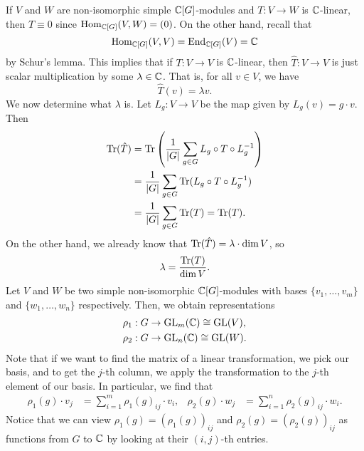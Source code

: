 If $V$ and $W$ are non-isomorphic simple $\mathbb{C}[G]$-modules and $T : V \to W$ 
is $\mathbb{C}$-linear, then $\hat T \equiv 0$ since $\operatorname{Hom}_{\mathbb{C}[G]}(V, W) = (0)$. 
On the other hand, recall that 
\[ \operatorname{Hom}_{\mathbb{C}[G]}(V, V) = \operatorname{End}_{\mathbb{C}[G]}(V) = \mathbb{C} \] 
by Schur's lemma. This implies that if $T : V \to V$ is $\mathbb{C}$-linear, then 
$\hat T : V \to V$ is just scalar multiplication by some $\lambda \in \mathbb{C}$. 
That is, for all $v \in V$, we have 
\[ \hat T(v) = \lambda v. \] 
We now determine what $\lambda$ is. Let $L_g : V \to V$ be the map given by 
$L_g(v) = g \cdot v$. Then 
\begin{align*}
    \operatorname{Tr}(\hat T) 
    &= \operatorname{Tr}\left( \frac1{|G|} \sum_{g\in G} L_g \circ T \circ L_g^{-1} \right) \\
    &= \frac1{|G|} \sum_{g\in G} \operatorname{Tr}(L_g \circ T \circ L_g^{-1}) \\ 
    &= \frac1{|G|} \sum_{g\in G} \operatorname{Tr}(T) = \operatorname{Tr}(T). 
\end{align*}
On the other hand, we already know that $\operatorname{Tr}(\hat T) = \lambda \cdot \dim V$, so 
\[ \lambda = \frac{\operatorname{Tr}(T)}{\dim V}. \] 
Let $V$ and $W$ be two simple non-isomorphic $\mathbb{C}[G]$-modules with bases 
$\{v_1, \dots, v_m\}$ and $\{w_1, \dots, w_n\}$ respectively. Then, we obtain 
representations 
\begin{align*}
    \rho_1 &: G \to \operatorname{GL}_m(\mathbb{C}) \cong \operatorname{GL}(V), \\ 
    \rho_2 &: G \to \operatorname{GL}_n(\mathbb{C}) \cong \operatorname{GL}(W). 
\end{align*}
Note that if we want to find the matrix of a linear transformation, we pick 
our basis, and to get the $j$-th column, we apply the transformation 
to the $j$-th element of our basis. In particular, we find that 
\begin{align*}
    \rho_1(g) \cdot v_j &= \sum_{i=1}^m \rho_1(g)_{ij} \cdot v_i, & 
    \rho_2(g) \cdot w_j &= \sum_{i=1}^n \rho_2(g)_{ij} \cdot w_i. 
\end{align*}
Notice that we can view $\rho_1(g) = (\rho_1(g))_{ij}$ and 
$\rho_2(g) = (\rho_2(g))_{ij}$ as functions from $G$ to $\mathbb{C}$ 
by looking at their $(i, j)$-th entries. 

